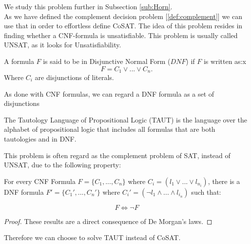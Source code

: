 We study this problem further  in Subsection \ref{sub:Horn}.\\



As we have defined the complement decision problem [\ref{def:complement}] we can use that in order to effortless define CoSAT. The idea of this problem resides in finding whether a CNF-formula is unsatisfiable. This problem is usually called UNSAT, as it looks for Unsatisfiability. 

\begin{definition}
  A formula $F$ is said to be in Disjunctive Normal Form ($DNF$) if $F$ is written as:x
  $$F = C_1\lor ... \lor C_n.$$
  Where $C_i$  are disjunctions of literals.
\end{definition}

As done with CNF formulas, we can regard a DNF formula as a set of disjunctions

\begin{definition}[TAUT] The Tautology Language of Propositional Logic (TAUT) is the language over the alphabet of propositional logic that includes all formulas that are both tautologies and in DNF. 
\end{definition}

This problem is often regard as the complement problem of SAT, instead of UNSAT, due to the following property:

\begin{proposition}
  For every CNF Formula $F=\{C_1,...,C_n\}$ where $C_i = (l_{1}\lor ... \lor l_{n_i})$, there is a DNF formula $F' = \{C_1',...,C_n'\}$ where $C_i' = (\neg l_1 \land ...\land l_{i_n})$ such that:

  $$F \iff \neg F$$
\end{proposition}
\begin{proof}
These results are a direct consequence of De Morgan's laws.
\end{proof}


Therefore we can choose to solve TAUT instead of CoSAT.









